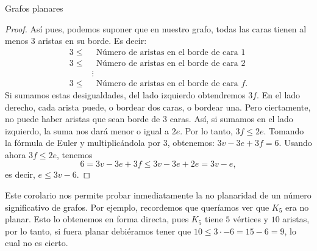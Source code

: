 \begin{section}{Grafos planares}
\begin{proof}
Así pues, podemos suponer que en nuestro grafo, todas las caras tienen al menos $3$ aristas en su borde. Es decir:
$$
\begin{aligned}
3\le &\,\text{ Número de aristas en el borde de cara }1 \\
3\le &\,\text{ Número de aristas en el borde de cara }2\\
&\vdots \\
3\le &\,\text{ Número de aristas en el borde de cara }f.
\end{aligned}
$$
Si sumamos estas desigualdades, del lado izquierdo obtendremos $3f$. En el lado derecho, cada arista puede, o bordear dos caras, o bordear una. Pero ciertamente, no puede haber aristas que sean borde de $3$ caras. Así, si sumamos en el lado izquierdo, la suma nos dará menor o igual a $2e$. Por lo tanto, $3f\le 2e$. Tomando la fórmula de Euler y multiplicándola por $3$, obtenemos: $3v-3e+3f=6$. Usando ahora $3f\le 2e$, tenemos
$$
6=3v-3e+3f\le 3v-3e+2e=3v-e,$$ es decir, $e\le 3v-6$.
\end{proof}

Este corolario nos permite probar inmediatamente la no planaridad de un número significativo de grafos. Por ejemplo, recordemos que queríamos ver que $K_5$ era no planar. Esto lo obtenemos en forma directa, pues $K_5$ tiene $5$ vértices y $10$ aristas, por lo tanto, si fuera planar debiéramos tener que $10\le 3\cdot  -6=15-6=9$, lo cual no es cierto.
\end{section}

